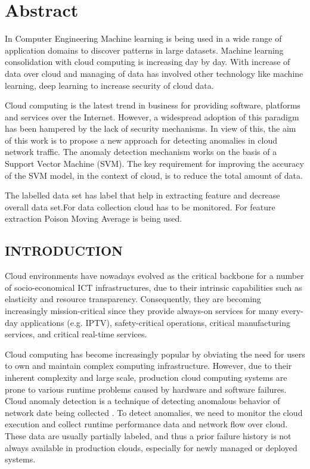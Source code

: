 \documentclass[a4paper, 12pt]{article}
\begin{document}
\section*{Abstract}
In Computer Engineering Machine learning is being used in a wide range of application domains to discover patterns in large datasets. Machine learning consolidation with cloud computing is increasing day by day. With increase of data over cloud and managing of data has involved other technology like machine learning, deep learning to increase security of cloud data.
\par 
Cloud computing is the latest trend in business for providing software, platforms and services over the Internet. However, a widespread adoption of this paradigm has been hampered by the lack of security mechanisms. In view of this, the aim of this work is to propose a new approach for detecting anomalies in cloud network traffic. The anomaly detection mechanism works on the basis of a Support Vector Machine (SVM). The key requirement for improving the accuracy of the SVM model, in the context of cloud, is to reduce the total amount of data.
\par
The labelled data set has label that help in extracting feature and decrease overall data set.For data collection cloud has to be monitored. For feature extraction Poison Moving Average is being used.  
\newpage
{}
\begin{center}
\section{INTRODUCTION}
\end{center}
\par
Cloud environments have nowadays evolved as the critical backbone for a number of socio-economical ICT infrastructures, due to their intrinsic capabilities such as elasticity and resource transparency. Consequently, they are becoming increasingly mission-critical since they provide always-on services for many every-day applications (e.g. IPTV), safety-critical operations, critical manufacturing services, and critical real-time services.
 \\ 
 
\par
Cloud computing has become increasingly popular by obviating the need for users to own and maintain complex computing infrastructure. However, due to their inherent complexity and large scale, production cloud computing systems are prone to various runtime problems caused by hardware and software failures. Cloud anomaly detection is a technique of detecting anomalous behavior of network date being collected . To detect anomalies, we need to monitor the cloud execution and collect runtime performance data and network flow over cloud. These data are usually partially labeled, and thus a prior failure history is not always available in production clouds, especially for newly managed or deployed systems.
\\
\end{document}
